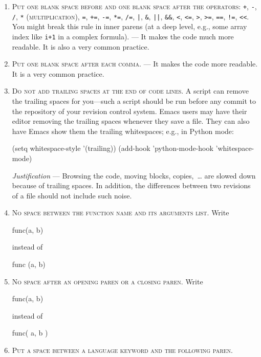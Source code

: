 \documentclass{tufte-book}
\newcounter{points}
\newcommand{\code}[1]{\texttt{#1}}
\renewcommand{\rule}[1]{\textsc{#1}}
\newcommand{\commentcs}[1]{\newline #1}
\newcommand{\commentf}[1]{#1}
\newcommand{\justification}[1]{\newline {\it Justification} --- #1}
\newcommand{\njustification}[1]{{\it Justification} --- #1}
\newenvironment{cenumerate}
{
  \begin{enumerate}\setcounter{enumi}{\value{points}}%
  }
  {
    \setcounter{points}{\value{enumi}}\end{enumerate}
}
\begin{document}
\begin{cenumerate}
\item \rule{Put one blank space before and one blank space after the
    operators: \code{+}, \code{-}, \code{/}, \code{*} (multiplication),
    \code{=}, \code{+=}, \code{-=}, \code{*=}, \code{/=}, \code{|}, \code{\&},
    \code{||}, \code{\&\&}, \code{<}, \code{<=}, \code{>}, \code{>=},
    \code{==}, \code{!=}, \code{<{}<}.}  \commentcs{You might break this rule in
    inner parens (at a deep level, e.g., some array index like \code{i+1} in a
    complex formula).} \justification{It makes the code much more readable. It
    is also a very common practice.}
\item \rule{Put one blank space after each comma.} \justification{It makes the
    code more readable. It is a very common practice.}
\item \rule{Do not add trailing spaces at the end of code lines.} \commentcs{A
    script can remove the trailing spaces for you---such a script should be
    run before any commit to the repository of your revision control
    system. Emacs users may have their editor removing the trailing spaces
    whenever they save a file. They can also have Emacs show them the trailing
    whitespaces; e.g., in Python mode:}
\begin{frame_lisp}
(setq whitespace-style '(trailing))
(add-hook 'python-mode-hook 'whitespace-mode)
\end{frame_lisp}
  \njustification{Browsing the code, moving blocks, copies,~\ldots{} are
    slowed down because of trailing spaces. In addition, the differences
    between two revisions of a file should not include such noise.}
\item \rule{No space between the function name and its arguments list.}
  \commentcs{Write}
\begin{frame_cpp}
  func(a, b)
\end{frame_cpp}
  \commentf{instead of}
\begin{frame_cpp}
  func (a, b)
\end{frame_cpp}
\item \rule{No space after an opening paren or a closing paren.}
  \commentcs{Write}
\begin{frame_cpp}
  func(a, b)
\end{frame_cpp}
  \commentf{instead of}
\begin{frame_cpp}
  func( a, b )
\end{frame_cpp}
\item \rule{Put a space between a language keyword and the following paren.}

\end{cenumerate}
\end{document}
